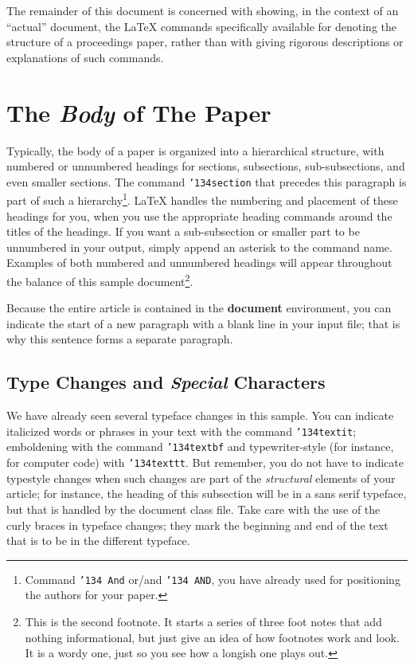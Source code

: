 \documentclass[article,english]{stucosrec}
\newcommand{\latex}{\LaTeX\xspace}
\begin{document}
	The remainder of this document is concerned with showing, in the context of an ``actual'' document, the \latex commands specifically available for denoting the structure of a proceedings paper, rather than with giving rigorous descriptions or explanations of such commands.
	
	\section{The \textit{Body} of The Paper}
	
	Typically, the body of a paper is organized into a hierarchical structure, with numbered or unnumbered headings for sections, subsections, sub-subsections, and even smaller sections.
	The command \texttt{{\char'134}section} that precedes this paragraph is part of such a hierarchy\footnote{Command {\texttt{\char'134 And}} or/and {\texttt{\char'134 AND}}, you have already used for positioning the authors for your paper.}. \latex handles the numbering and placement of these headings for you, when you use the appropriate heading commands around the titles of the headings.
	If you want a sub-subsection or smaller part to be unnumbered in your output, simply append an asterisk to the command name.
	Examples of both numbered and unnumbered headings will appear throughout the balance of this sample document\footnote{This is the second footnote. It starts a series of three foot notes that add nothing informational, but just give an idea of how footnotes work and look. It is a wordy one, just so you see how a longish one plays out.}.
	
	Because the entire article is contained in the \textbf{document} environment, you can indicate the start of a new paragraph with a blank line in your input file; that is why this sentence forms a separate paragraph.
	
	\subsection{Type Changes and \textit{Special} Characters}
	
	We have already seen several typeface changes in this sample.
	You can indicate italicized words or phrases in your text with the command \texttt{{\char'134}textit}; emboldening with the command \texttt{{\char'134}textbf} and typewriter-style (for instance, for computer code) with \texttt{{\char'134}texttt}.
	But remember, you do not have to indicate typestyle changes when such changes are part of the \textit{structural} elements of your 	article; for instance, the heading of this subsection will be in a sans serif typeface, but that is handled by the document class file. Take care with the use of the curly braces in typeface changes; they mark the beginning and end of the text that is to be in the different typeface.
	
\end{document}
